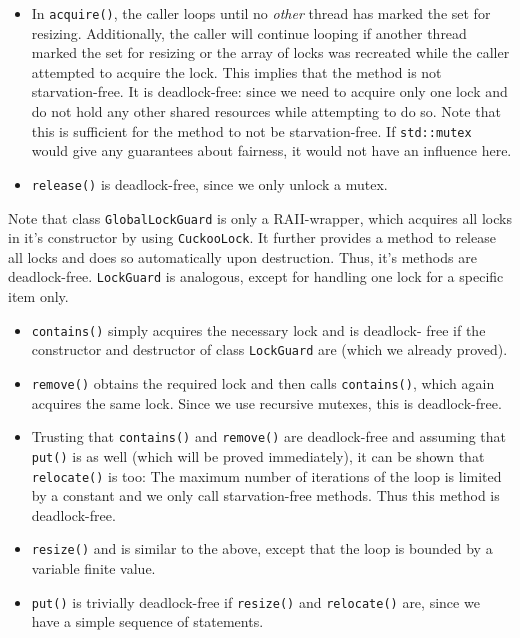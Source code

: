 \documentclass[a4paper,10pt]{article}
\begin{document}
\begin{itemize}
\item In \lstinline|acquire()|, the caller loops until no \textit{other} thread
    has marked the set for resizing. Additionally, the caller will continue
    looping if another thread marked the set for resizing or the array of locks
    was recreated while the caller attempted to acquire the lock. This implies
    that the method is not starvation-free. It is deadlock-free: since we need
    to acquire only one lock and do not hold any other shared resources while
    attempting to do so. Note that this is sufficient for the method to not be
    starvation-free. If \lstinline|std::mutex| would  give any guarantees about
    fairness, it would not have an influence here. 

\item \lstinline|release()| is deadlock-free, since we only unlock a mutex.
\end{itemize}

Note that class \lstinline|GlobalLockGuard| is only a RAII-wrapper, which
acquires all locks in it's constructor by using \lstinline|CuckooLock|. It
further provides a method to release all locks and does so automatically upon
destruction. Thus, it's methods are deadlock-free. \lstinline|LockGuard| is
analogous, except for handling one lock for a specific item only. 

\begin{itemize}
\item \lstinline|contains()| simply acquires the necessary lock and is
    deadlock- free if the constructor and destructor of class
    \lstinline|LockGuard| are (which we already proved).

\item \lstinline|remove()| obtains the required lock and then calls
    \lstinline|contains()|, which again acquires the same lock. Since we use
    recursive mutexes, this is deadlock-free. 

\item Trusting that \lstinline|contains()| and \lstinline|remove()| are
    deadlock-free and assuming that \lstinline|put()| is as well (which will be
    proved immediately), it can be shown that \lstinline|relocate()| is too:
    The maximum number of iterations of the loop is limited by a constant and
    we only call starvation-free methods. Thus this method is deadlock-free.

\item \lstinline|resize()| and is similar to the above, except that the loop is
    bounded by a variable finite value.

\item \lstinline|put()| is trivially deadlock-free if \lstinline|resize()| and
    \lstinline|relocate()| are, since we have a simple sequence of statements. 
\end{itemize}
\end{document}
